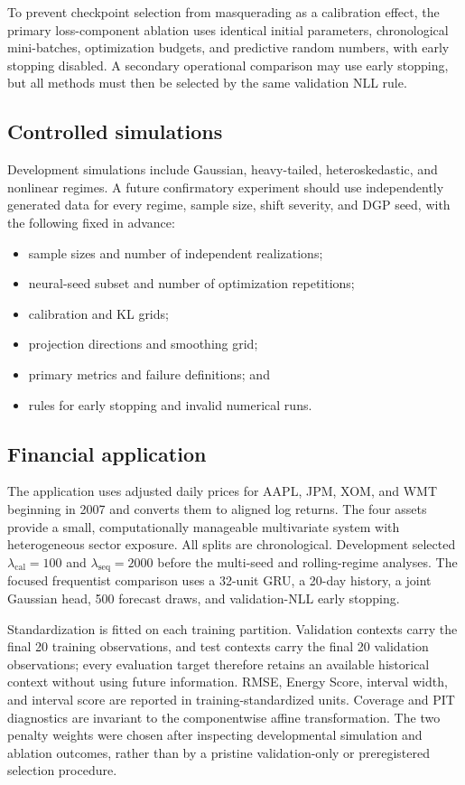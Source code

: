 \documentclass[11pt]{article}
\begin{document}
To prevent checkpoint selection from masquerading as a calibration effect, the
primary loss-component ablation uses identical initial parameters, chronological
mini-batches, optimization budgets, and predictive random numbers, with early
stopping disabled. A secondary operational comparison may use early stopping, but
all methods must then be selected by the same validation NLL rule.

\subsection{Controlled simulations}

Development simulations include Gaussian, heavy-tailed, heteroskedastic, and
nonlinear regimes. A future confirmatory experiment should use independently
generated data for every regime, sample size, shift severity, and DGP seed, with
the following fixed in advance:
\begin{itemize}
    \item sample sizes and number of independent realizations;
    \item neural-seed subset and number of optimization repetitions;
    \item calibration and KL grids;
    \item projection directions and smoothing grid;
    \item primary metrics and failure definitions; and
    \item rules for early stopping and invalid numerical runs.
\end{itemize}

\subsection{Financial application}

The application uses adjusted daily prices for AAPL, JPM, XOM, and WMT beginning
in 2007 and converts them to aligned log returns. The four assets provide a small,
computationally manageable multivariate system with heterogeneous sector exposure.
All splits are chronological. Development selected
$\lambda_{\mathrm{cal}}=100$ and $\lambda_{\mathrm{seq}}=2000$ before the
multi-seed and rolling-regime analyses. The focused frequentist comparison uses a
32-unit GRU, a 20-day history, a joint Gaussian head, 500 forecast draws, and
validation-NLL early stopping.

Standardization is fitted on each training partition. Validation contexts carry
the final 20 training observations, and test contexts carry the final 20
validation observations; every evaluation target therefore retains an available
historical context without using future information. RMSE, Energy Score, interval
width, and interval score are reported in training-standardized units. Coverage
and PIT diagnostics are invariant to the componentwise affine transformation.
The two penalty weights were chosen after inspecting developmental simulation
and ablation outcomes, rather than by a pristine validation-only or preregistered
selection procedure.
\end{document}
